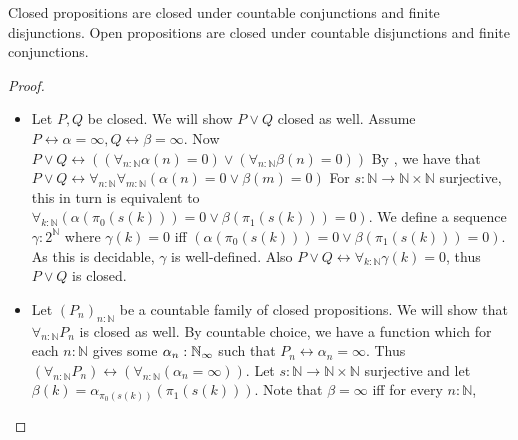 \documentclass{../util/zariski-small}
\begin{document}
\begin{lemma}\label{lemOpenClosedDisjunctionConjunction}
  Closed propositions are closed under countable conjunctions %
  and finite disjunctions.
  Open propositions are closed under countable disjunctions %
  and finite conjunctions. 
\end{lemma}
\begin{proof}
  \begin{itemize}
    \item Let $P,Q$ be closed. We will show $P\vee Q$ closed as well. 
      Assume $P\leftrightarrow \alpha = \infty, Q \leftrightarrow \beta = \infty$. 
      Now $P\vee Q \leftrightarrow 
      ((\forall_{n:\mathbb N} \alpha(n) = 0) 
      \vee (\forall_{n:\mathbb N} \beta(n) = 0))$
      By , we have that 
      $P\vee Q \leftrightarrow 
      \forall_{n:\mathbb N}  \forall_{m:\mathbb N}  (\alpha(n) = 0 \vee \beta(m) = 0)$
      For $s:\mathbb N \to \mathbb N \times \mathbb N$ surjective, 
      this in turn is equivalent to 
      $\forall_{k:\mathbb N}  (\alpha(\pi_0(s(k))) = 0 \vee \beta(\pi_1(s(k))) = 0)$. 
      We define a sequence $\gamma:2^\mathbb N$ where 
      $\gamma(k) = 0$ iff $(\alpha(\pi_0(s(k))) = 0 \vee \beta(\pi_1(s(k))) = 0)$. 
      As this is decidable, $\gamma$ is well-defined.
      Also
      $P\vee Q \leftrightarrow \forall_{k:\mathbb N} \gamma(k) = 0$, 
      thus $P\vee Q$ is closed. 
    \item Let $(P_n)_{n:\mathbb N}$ be a countable family of closed propositions. 
      We will show that 
      $\forall_{n:\mathbb N} P_n$ is closed as well. 
      By countable choice, we have a function which for each 
      $n:\mathbb N$ gives some $\alpha_n:\mathbb{N}_{\infty}$ 
      such that $P_n \leftrightarrow \alpha_n =\infty$. 
      Thus $(\forall_{n:\mathbb N} P_n )\leftrightarrow 
      (\forall_{n:\mathbb N}(\alpha_n = \infty))$. 
      Let $s:\mathbb N \to \mathbb N \times \mathbb N$ surjective and let 
      $\beta(k) = \alpha_{\pi_0(s(k))}(\pi_1 (s(k)))$. 
      Note that $\beta = \infty$ iff for every $n:\mathbb N$, 

\end{itemize}
\end{proof}
\end{document}
